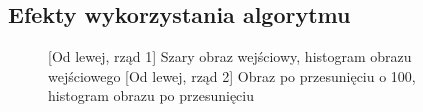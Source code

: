 \documentclass[a4paper,12pt, titlepage]{report}
\begin{document}
\subsection*{Efekty wykorzystania algorytmu}
\begin{figure}[h]
    \centering
    \qquad
    \caption{[Od lewej, rząd 1] Szary obraz wejściowy, histogram obrazu wejściowego [Od lewej, rząd 2] Obraz po przesunięciu o 100, histogram obrazu po przesunięciu}%
    \label{fig:geo_after_grey1}%
\end{figure}
\end{document}
